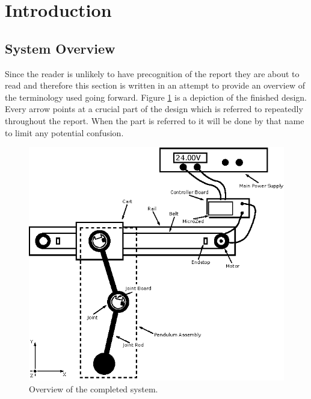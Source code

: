 \section{Introduction}
\lipsum[5]
\subsection{System Overview} %
\label{sub:system_overview}
Since the reader is unlikely to have precognition of the report they are about to read and therefore this section is written in an attempt to provide an overview of the terminology used going forward.
Figure \ref{fig:systemoverview} is a depiction of the finished design.
Every arrow points at a crucial part of the design which is referred to repeatedly throughout the report.
When the part is referred to it will be done by that name to limit any potential confusion.
\begin{figure}[h]
	\centering
	\includegraphics[width=\linewidth]{graphics/system_overview}
	\caption{Overview of the completed system.}
	\label{fig:systemoverview}
\end{figure}

